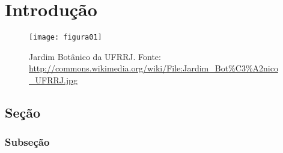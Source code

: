 \setcounter{page}{1}
\artigofalse
\chapter{Introdução}
\label{chap:introduction}

\blindtext[2]

\begin{figure}[!ht]
\centering
\texttt{[image: figura01]}
\caption{Jardim Botânico da UFRRJ. Fonte: \url{http://commons.wikimedia.org/wiki/File:Jardim_Bot\%C3\%A2nico_UFRRJ.jpg}}
\label{fig:jardim}
\end{figure}

\blindtext[1]

\section{Seção}

\blindtext[2]

\subsection{Subseção}

\blindtext[2]
